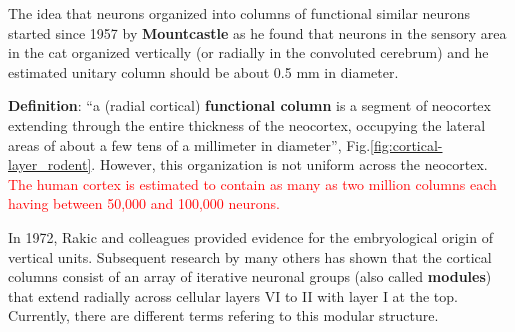 The idea that neurons organized into columns of functional similar neurons
started since 1957 by {\bf Mountcastle} as he found that neurons in the
sensory area in the cat organized vertically (or radially in the convoluted
cerebrum) and he estimated unitary column should be about 0.5 mm in diameter. 

{\bf Definition}: ``a (radial cortical) {\bf
functional column} is a segment of neocortex extending through the entire
thickness of the neocortex, occupying the lateral areas of about a few tens of a
millimeter in diameter'', Fig.\ref{fig:cortical-layer_rodent}. However, this
organization is not uniform across the neocortex.
\textcolor{red}{The human cortex is estimated to contain as many as two million
columns each
 having between 50,000 and 100,000 neurons.}
 
In 1972, Rakic and colleagues provided evidence for the embryological origin of
vertical units. Subsequent research by many others has shown that the cortical
columns consist of an array of iterative neuronal groups (also called {\bf
modules}) that extend radially across cellular layers VI to II with layer I at
the top. Currently, there are different terms refering to this modular
structure.


